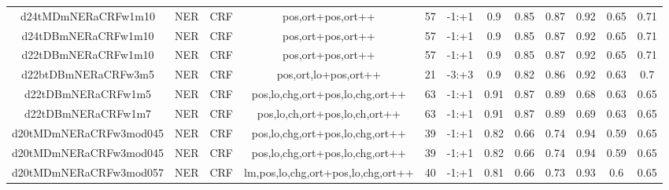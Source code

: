 \documentclass[a4paper]{article}
\begin{document}
\begin{landscape}
\begin{center}
\begin{tabular}{ |c|c|c|c|c|c|c|c|c|c|c|c|}
 	
 	\small{ d24tMDmNERaCRFw1m10 } & \small{ NER} & \small{  CRF }  & pos,ort+pos,ort++  &  57 &  \small{  -1:+1 }  &  0.9 & 0.85 & 0.87  &  0.92 & 0.65 & 0.71 \\
 	

 
 	
 	\small{ d24tDBmNERaCRFw1m10 } & \small{ NER} & \small{  CRF }  & pos,ort+pos,ort++  &  57 &  \small{  -1:+1 }  &  0.9 & 0.85 & 0.87  &  0.92 & 0.65 & 0.71 \\
 	

 
 	
 	\small{ d22tDBmNERaCRFw1m10 } & \small{ NER} & \small{  CRF }  & pos,ort+pos,ort++  &  57 &  \small{  -1:+1 }  &  0.9 & 0.85 & 0.87  &  0.92 & 0.65 & 0.71 \\
 	

 
 	
 	\small{ d22btDBmNERaCRFw3m5 } & \small{ NER} & \small{  CRF }  & pos,ort,lo+pos,ort++  &  21 &  \small{  -3:+3 }  &  0.9 & 0.82 & 0.86  &  0.92 & 0.63 & 0.7 \\
 	

 
 	
 	\small{ d22tDBmNERaCRFw1m5 } & \small{ NER} & \small{  CRF }  & pos,lo,chg,ort+pos,lo,chg,ort++  &  63 &  \small{  -1:+1 }  &  0.91 & 0.87 & 0.89  &  0.68 & 0.63 & 0.65 \\
 	

 
 	
 	\small{ d22tDBmNERaCRFw1m7 } & \small{ NER} & \small{  CRF }  & pos,lo,ch,ort+pos,lo,ch,ort++  &  63 &  \small{  -1:+1 }  &  0.91 & 0.87 & 0.89  &  0.69 & 0.63 & 0.65 \\
 	

 
 	
 	\small{ d20tMDmNERaCRFw3mod045 } & \small{ NER} & \small{  CRF }  & pos,lo,chg,ort+pos,lo,chg,ort++  &  39 &  \small{  -1:+1 }  &  0.82 & 0.66 & 0.74  &  0.94 & 0.59 & 0.65 \\
 	

 
 	
 	\small{ d20tMDmNERaCRFw3mod045 } & \small{ NER} & \small{  CRF }  & pos,lo,chg,ort+pos,lo,chg,ort++  &  39 &  \small{  -1:+1 }  &  0.82 & 0.66 & 0.74  &  0.94 & 0.59 & 0.65 \\
 	

 
 	
 	\small{ d20tMDmNERaCRFw3mod057 } & \small{ NER} & \small{  CRF }  & lm,pos,lo,chg,ort+pos,lo,chg,ort++  &  40 &  \small{  -1:+1 }  &  0.81 & 0.66 & 0.73  &  0.93 & 0.6 & 0.65 \\
 	


\end{tabular}
\end{center}
\end{landscape}
\end{document}
